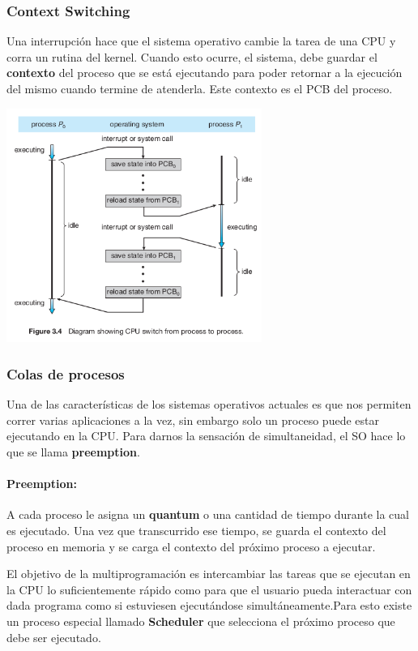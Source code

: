\subsubsection{Context Switching}
Una interrupción hace que el sistema operativo cambie la tarea de una CPU y corra un rutina del kernel. Cuando esto ocurre, el sistema, debe guardar el \textbf{contexto} del proceso que se está ejecutando para poder retornar a la ejecución del mismo cuando termine de atenderla. Este contexto es el PCB del proceso.

\vspace*{0.5cm}
\begin{center}
	\includegraphics[width=0.625\textwidth]{imagenes/context-switch.png}

\end{center}

	\subsubsection{Colas de procesos}
Una de las características de los sistemas operativos actuales es que nos permiten correr varias aplicaciones a la vez, sin embargo solo un proceso puede estar ejecutando en la CPU. Para darnos la sensación de simultaneidad, el SO hace lo que se llama \textbf{preemption}.

\paragraph{Preemption:} A cada proceso le asigna un \textbf{quantum} o una cantidad de tiempo durante la cual es ejecutado. Una vez que transcurrido ese tiempo, se guarda el contexto del proceso en memoria y se carga el contexto del próximo proceso a ejecutar.

El objetivo de la multiprogramación es intercambiar las tareas que se ejecutan en la CPU lo suficientemente rápido como para que el usuario pueda interactuar con dada programa como si estuviesen ejecutándose simultáneamente.Para esto existe un proceso especial llamado \textbf{Scheduler} que selecciona el próximo proceso que debe ser ejecutado.

